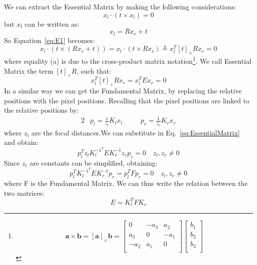 We can extract the Essential Matrix by making the following considerations:
\begin{equation}
    \label{eq:E1}
    x_l \cdot (t \times x_l) = 0
\end{equation}
but $x_l$ can be written as:
\begin{equation}
    x_l = R x_r + t
\end{equation}
So Equation~\ref{eq:E1} becomes:
\begin{equation}
    x_l \cdot (t \times (R x_r + t)) = x_l \cdot (t \times R x_r) \stackrel{a}{=}x_l^T  \left[ t\right]_{\times}  R x_r= 0
\end{equation}
where equality (a) is due to the cross-product matrix notation\footnote{
    \[
  \mathbf{a} \times  \mathbf{b}= \left[\mathbf{a}\right] _{\times} \mathbf{b}= \begin{bmatrix}
    0 & -a_3 & a_2 \\
    a_3 & 0 & -a_1 \\
    -a_2 & a_1     & 0     \\
  \end{bmatrix}
  \begin{bmatrix}
    b_1 \\
    b_2\\
    b_3\\
  \end{bmatrix}
\]}.
We call Essential Matrix the term $ \left[ t\right]_{\times}  R$, such that:
\begin{equation}
    \label{eq:EssentialMatrix}
    x_l^T  \left[ t\right]_{\times}  R x_r=x_l^T E x_r= 0
\end{equation}
In a similar way we can get the Fundamental Matrix, by replacing the relative positions
with the pixel positions. Recalling that the pixel positions are linked to the relative positions
by:
\begin{alignat}{2}
    &p_l = \frac{1}{z_l}K_l x_l  &\quad &p_r = \frac{1}{z_r}K_r x_r
\end{alignat}
where $z_i$ are the focal distances.We can substitute in Eq.~\ref{eq:EssentialMatrix} and obtain:
\begin{equation}
    p_l^T z_l K^{-1^T}_l E K_r^{-1} z_r p_r = 0 \quad z_l,z_r \neq 0
\end{equation}
Since $z_i$ are constants can be simplified, obtaining:
\begin{equation}
    \label{eq:Fund}
    p_l^T  K^{-1^T}_l E K_r^{-1} p_r = p_l^T  F p_r=0 \quad z_l,z_r \neq 0
\end{equation}
where F is the Fundamental Matrix. We can thus write the relation between the two matrices:
\begin{equation}
    E = K_l ^{T} F K_r
\end{equation}



